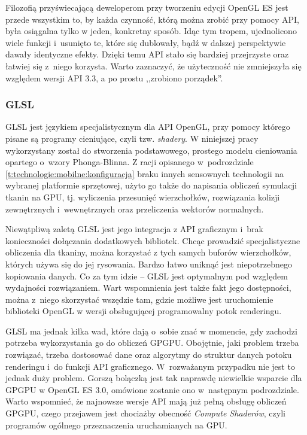 			Filozofią przyświecającą deweloperom przy tworzeniu edycji OpenGL ES jest przede wszystkim to, by każda czynność, którą można zrobić przy pomocy API, była osiągalna tylko w jeden, konkretny sposób. Idąc tym tropem, ujednolicono wiele funkcji i~usunięto te, które się dublowały, bądź w dalszej perspektywie dawały identyczne efekty. Dzięki temu API stało się bardziej przejrzyste oraz łatwiej się z~niego korzysta. Warto zaznaczyć, że użyteczność nie zmniejszyła się względem wersji API 3.3, a po prostu ,,zrobiono porządek''.
			
			\subsubsection{GLSL}
			\label{t:technologie:narzedzia:ogl:glsl}
			
			
			GLSL jest językiem specjalistycznym dla API OpenGL, przy pomocy którego pisane są programy cieniujące, czyli tzw. \emph{shadery}. W niniejszej pracy wykorzystany został do stworzenia podstawowego, prostego modelu cieniowania opartego o~wzory Phonga-Blinna. Z racji opisanego w~podrozdziale \ref{t:technologie:mobilne:konfiguracja} braku innych sensownych technologii na wybranej platformie sprzętowej, użyto go także do napisania obliczeń symulacji tkanin na GPU, tj. wyliczenia przesunięć wierzchołków, rozwiązania kolizji zewnętrznych i~wewnętrznych oraz przeliczenia wektorów normalnych.
			
			Niewątpliwą zaletą GLSL jest jego integracja z API graficznym i~brak konieczności dołączania dodatkowych bibliotek. Chcąc prowadzić specjalistyczne obliczenia dla tkaniny, można korzystać z tych samych buforów wierzchołków, których używa się do jej rysowania. Bardzo łatwo uniknąć jest niepotrzebnego kopiowania danych. Co za tym idzie -- GLSL jest optymalnym pod względem wydajności rozwiązaniem. Wart wspomnienia jest także fakt jego dostępności, można z~niego skorzystać wszędzie tam, gdzie możliwe jest uruchomienie biblioteki OpenGL w wersji obsługującej programowalny potok renderingu. 
			
			GLSL ma jednak kilka wad, które dają o~sobie znać w momencie, gdy zachodzi potrzeba wykorzystania go do obliczeń GPGPU. Obojętnie, jaki problem trzeba rozwiązać, trzeba dostosować dane oraz algorytmy do struktur danych potoku renderingu i~do funkcji API graficznego. W~rozważanym przypadku nie jest to jednak duży problem. Gorszą bolączką jest tak naprawdę niewielkie wsparcie dla GPGPU w OpenGL ES 3.0, omówione zostanie ono w~następnym podrozdziale. Warto wspomnieć, że najnowsze wersje API mają już pełną obsługę obliczeń GPGPU, czego przejawem jest chociażby obecność \emph{Compute Shaderów}, czyli programów ogólnego przeznaczenia uruchamianych na GPU.
			
